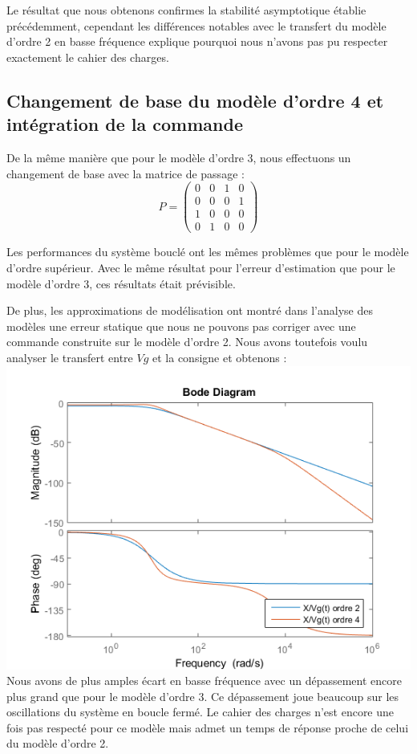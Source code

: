 Le résultat que nous obtenons confirmes la stabilité asymptotique établie précédemment, cependant les différences notables avec le transfert du modèle d'ordre 2 en basse fréquence explique pourquoi nous n'avons pas pu respecter exactement le cahier des charges. 

\subsection{Changement de base du modèle d'ordre 4 et intégration de la commande\label{sub:observateurSurModelO4}}
De la même manière que pour le modèle d'ordre 3, nous effectuons un changement de base avec la matrice de passage : \begin{equation}
P = \begin{pmatrix}
0 &0& 1& 0\\ 0& 0& 0& 1\\1& 0& 0& 0\\ 0& 1& 0& 0
\end{pmatrix}
\end{equation}

Les performances du système bouclé ont les mêmes problèmes que pour le modèle d'ordre supérieur. Avec le même résultat pour l'erreur d'estimation que pour le modèle d'ordre 3, ces résultats était prévisible.

De plus, les approximations de modélisation ont montré dans l'analyse des modèles une erreur statique que nous ne pouvons pas corriger avec une commande construite sur le modèle d'ordre 2. Nous avons toutefois voulu analyser le transfert entre $Vg$ et la consigne et obtenons :
\includegraphics[scale=1]{./III/figure/bode_Tpert_EE0.png}
Nous avons de plus amples écart en basse fréquence avec un dépassement encore plus grand que pour le modèle d'ordre 3. Ce dépassement joue beaucoup sur les oscillations du système en boucle fermé. Le cahier des charges n'est encore une fois pas respecté pour ce modèle mais admet un temps de réponse proche de celui du modèle d'ordre 2.

